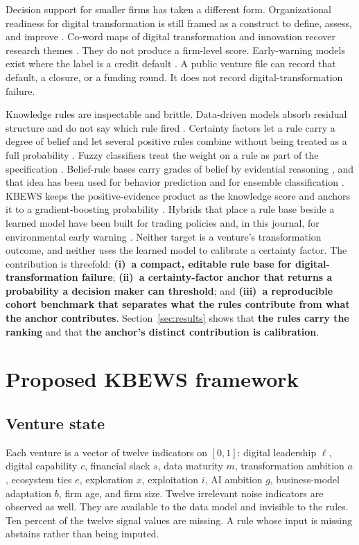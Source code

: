 \documentclass[preprint,12pt]{elsarticle}
\begin{document}
Decision support for smaller firms has taken a different form. Organizational readiness for digital transformation is still framed as a construct to define, assess, and improve \cite{michelotto2024}. Co-word maps of digital transformation and innovation recover research themes \cite{gao2022}. They do not produce a firm-level score. Early-warning models exist where the label is a credit default \cite{chen2010}. A public venture file can record that default, a closure, or a funding round. It does not record digital-transformation failure.

Knowledge rules are inspectable and brittle. Data-driven models absorb residual structure and do not say which rule fired \cite{steenwinckel2021}. Certainty factors let a rule carry a degree of belief and let several positive rules combine without being treated as a full probability \cite{shortliffe1975}. Fuzzy classifiers treat the weight on a rule as part of the specification \cite{ishibuchi2005}. Belief-rule bases carry grades of belief by evidential reasoning \cite{yang2006}, and that idea has been used for behavior prediction \cite{si2011} and for ensemble classification \cite{you2021}. KBEWS keeps the positive-evidence product as the knowledge score and anchors it to a gradient-boosting probability \cite{friedman2001}. Hybrids that place a rule base beside a learned model have been built for trading policies \cite{kwon2024} and, in this journal, for environmental early warning \cite{jiang2019}. Neither target is a venture's transformation outcome, and neither uses the learned model to calibrate a certainty factor. The contribution is threefold: \textbf{(i)~a compact, editable rule base for digital-transformation failure}; \textbf{(ii)~a certainty-factor anchor that returns a probability a decision maker can threshold}; and \textbf{(iii)~a reproducible cohort benchmark that separates what the rules contribute from what the anchor contributes}. Section~\ref{sec:results} shows that \textbf{the rules carry the ranking} and that \textbf{the anchor's distinct contribution is calibration}.

\section{Proposed KBEWS framework}
\label{sec:method}

\subsection{Venture state}
Each venture is a vector of twelve indicators on $[0,1]$: digital leadership $\ell$, digital capability $c$, financial slack $s$, data maturity $m$, transformation ambition $a$, ecosystem ties $e$, exploration $x$, exploitation $i$, AI ambition $g$, business-model adaptation $b$, firm age, and firm size. Twelve irrelevant noise indicators are observed as well. They are available to the data model and invisible to the rules. Ten percent of the twelve signal values are missing. A rule whose input is missing abstains rather than being imputed.
\end{document}
